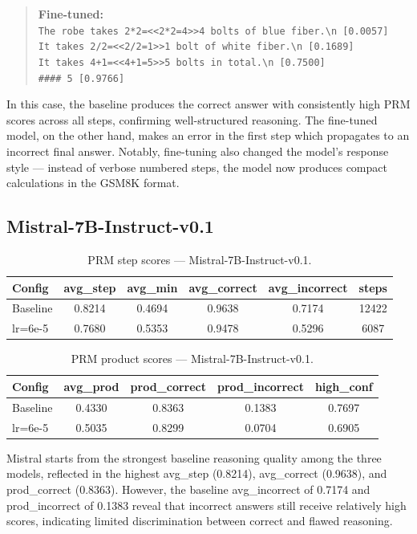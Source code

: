   \begin{quote}
  \textbf{Fine-tuned:}\\
  \texttt{The robe takes 2*2=<<2*2=4>>4 bolts of
  blue fiber.\textbackslash n [0.0057]\\
  It takes 2/2=<<2/2=1>>1 bolt of white fiber.\textbackslash n [0.1689]\\
  It takes 4+1=<<4+1=5>>5 bolts in total.\textbackslash n [0.7500]\\
  \#\#\#\# 5  [0.9766]}
  \end{quote}
In this case, the baseline produces the correct
  answer with consistently high PRM scores across
  all steps, confirming well-structured reasoning.
  The fine-tuned model, on the other hand, makes
  an error in the first step which propagates to
  an incorrect final answer. Notably, fine-tuning
  also changed the model's response style --- instead
  of verbose numbered steps, the model now produces
  compact calculations in the GSM8K format.


  \subsection{Mistral-7B-Instruct-v0.1}

  \begin{table}[ht]
  \caption{PRM step scores --- Mistral-7B-Instruct-v0.1.}
  \centering
  \footnotesize
  \begin{tabular}{lccccc}
  \toprule
  \textbf{Config} & \textbf{avg\_step} & \textbf{avg\_min} & \textbf{avg\_correct} & \textbf{avg\_incorrect} & \textbf{steps} \\
  \midrule
  Baseline      & 0.8214 & 0.4694 & 0.9638 & 0.7174 & 12422 \\
  lr=6e-5 & 0.7680 & 0.5353 & 0.9478 & 0.5296 & 6087 \\
  \bottomrule
  \end{tabular}

  \label{tab:prm-mistral-1}
  \end{table}

  \begin{table}[ht]
  \caption{PRM product scores --- Mistral-7B-Instruct-v0.1.}
  \centering
  \footnotesize
  \begin{tabular}{lcccc}
  \toprule
  \textbf{Config} & \textbf{avg\_prod} & \textbf{prod\_correct} & \textbf{prod\_incorrect} & \textbf{high\_conf} \\
  \midrule
  Baseline      & 0.4330 & 0.8363 & 0.1383 & 0.7697 \\
  lr=6e-5 & 0.5035 & 0.8299 & 0.0704 & 0.6905 \\
  \bottomrule
  \end{tabular}

  \label{tab:prm-mistral-2}
  \end{table}
Mistral starts from the strongest baseline
  reasoning quality among the three models,
  reflected in the highest avg\_step (0.8214),
  avg\_correct (0.9638), and prod\_correct (0.8363).  However, the baseline
  avg\_incorrect of 0.7174 and prod\_incorrect of
  0.1383 reveal that incorrect answers still
  receive relatively high scores, indicating
  limited discrimination between correct and
  flawed reasoning.

